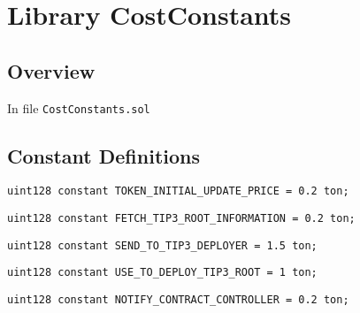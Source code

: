 
\chapter{Library CostConstants}

\minitoc

\section{Overview}


In file {\tt CostConstants.sol}

\section{Constant Definitions}


\begin{lstlisting}[firstnumber=4]
    uint128 constant TOKEN_INITIAL_UPDATE_PRICE = 0.2 ton;
\end{lstlisting}

\begin{lstlisting}[firstnumber=5]
    uint128 constant FETCH_TIP3_ROOT_INFORMATION = 0.2 ton;
\end{lstlisting}

\begin{lstlisting}[firstnumber=6]
    uint128 constant SEND_TO_TIP3_DEPLOYER = 1.5 ton;
\end{lstlisting}

\begin{lstlisting}[firstnumber=7]
    uint128 constant USE_TO_DEPLOY_TIP3_ROOT = 1 ton;
\end{lstlisting}

\begin{lstlisting}[firstnumber=8]
    uint128 constant NOTIFY_CONTRACT_CONTROLLER = 0.2 ton;
\end{lstlisting}
